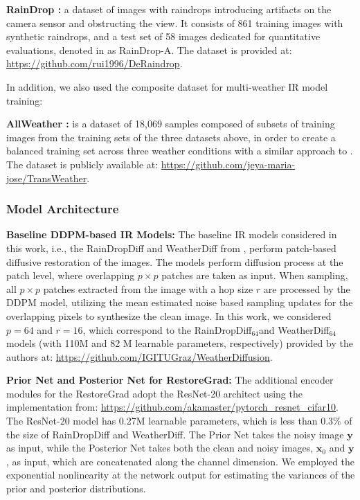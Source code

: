 \noindent\textbf{RainDrop \citep{qian2018attentive}:} a dataset of images with raindrops
introducing artifacts on the camera sensor and obstructing the view. It consists of 861 training images with synthetic raindrops, and a test set of 58 images dedicated for quantitative evaluations, denoted in \citet{qian2018attentive} as RainDrop-A. The dataset is provided at: \url{https://github.com/rui1996/DeRaindrop}.

In addition, we also used the composite dataset for multi-weather IR model training:

\noindent\textbf{AllWeather \citep{valanarasu2022transweather}:} is a dataset of 18,069 samples composed of subsets of training images from the training sets of the three datasets above, in order to create a balanced training set across three weather conditions with a similar approach to \citet{li2020all}. The dataset is publicly available at: \url{https://github.com/jeya-maria-jose/TransWeather}.

\subsubsection{Model Architecture}
\label{appendix: model arch of ir for weather}
\noindent\textbf{Baseline DDPM-based IR Models:} The baseline IR models considered in this work, i.e., the RainDropDiff and WeatherDiff from \citet{ozdenizci2023restoring}, perform patch-based diffusive restoration of the images. The models perform diffusion process at the patch level, where overlapping $p\times p$ patches are taken as input. When sampling, all $p\times p$ patches extracted from the image with a hop size $r$ are processed by the DDPM model, utilizing the mean estimated noise based sampling updates for the overlapping pixels to synthesize the clean image. In this work, we considered $p=64$ and $r=16$, which correspond to the RainDropDiff$_{64}$and WeatherDiff$_{64}$ models (with 110M and 82 M learnable parameters, respectively) provided by the authors at: \url{https://github.com/IGITUGraz/WeatherDiffusion}.

\noindent\textbf{Prior Net and Posterior Net for RestoreGrad:} The additional encoder modules for the RestoreGrad adopt the ResNet-20 architect \citep{he2016deep} using the implementation from: \url{https://github.com/akamaster/pytorch_resnet_cifar10}. The ResNet-20 model has 0.27M learnable parameters, which is less than 0.3\% of the size of RainDropDiff and WeatherDiff. The Prior Net takes the noisy image $\mathbf{y}$ as input, while the Posterior Net takes both the clean and noisy images, $\mathbf{x}_0$ and $\mathbf{y}$, as input, which are concatenated along the channel dimension. We employed the exponential nonlinearity at the network output for estimating the variances of the prior and posterior distributions.

